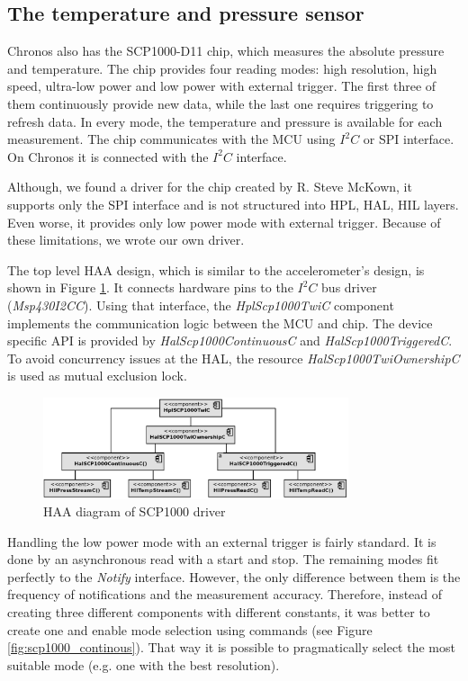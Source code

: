 \subsection{The temperature and pressure sensor}
Chronos also has the SCP1000-D11 chip, which measures the absolute pressure and temperature. The chip provides four reading modes: high resolution, high speed, ultra-low power and low power with external trigger.
The first three of them continuously provide new data, while the last one requires triggering to refresh data.
In every mode, the temperature and pressure is available for each measurement.
The chip communicates with the MCU using $I^2C$ or SPI interface.
On Chronos it is connected with the $I^2C$ interface.

Although, we found a driver for the chip \cite{SCP1000SpiDriver} created by R. Steve McKown, it supports only the SPI interface and is not structured into HPL, HAL, HIL layers.
Even worse, it provides only low power mode with external trigger.
Because of these limitations, we wrote our own driver.

The top level HAA design, which is similar to the accelerometer's design, is shown in Figure \ref{fig:scp1000_haa}.
It connects hardware pins to the $I^2C$ bus driver (\emph{Msp430I2CC}).
Using that interface, the \emph{HplScp1000TwiC} component implements the communication logic between the MCU and chip.
The device specific API is provided by \emph{HalScp1000ContinuousC} and \emph{HalScp1000TriggeredC}.
To avoid concurrency issues at the HAL, the resource \emph{HalScp1000TwiOwnershipC} is used as mutual exclusion lock.

\begin{figure}[h]
  \centering
  \includegraphics[width=0.8\textwidth]{diagrams/scp1000_haa.eps}
  \caption{HAA diagram of SCP1000 driver}
  \label{fig:scp1000_haa}
\end{figure}

Handling the low power mode with an external trigger is fairly standard.
It is done by an asynchronous read with a start and stop. 
The remaining modes fit perfectly to the \emph{Notify} interface.
However, the only difference between them is the frequency of notifications and the measurement accuracy.
Therefore, instead of creating three different components with different constants, it was better to create one and enable mode selection using commands (see Figure \ref{fig:scp1000_continous}).
That way it is possible to pragmatically select the most suitable mode (e.g. one with the best resolution).

